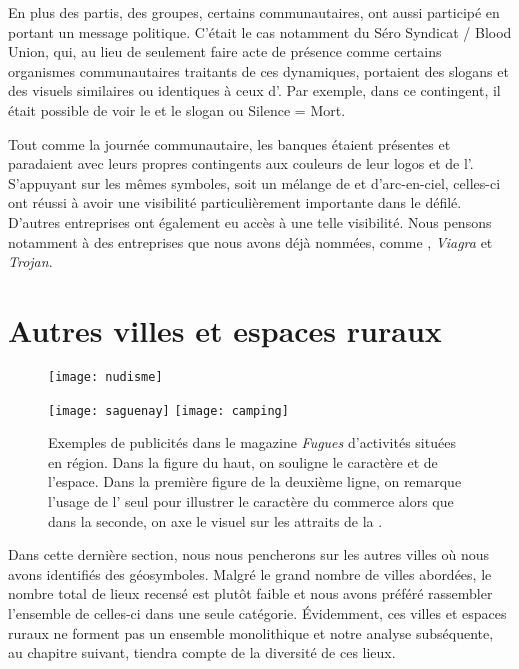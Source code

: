 En plus des partis, des groupes, certains communautaires, ont aussi participé en portant un message politique.
C'était le cas notamment du Séro Syndicat / Blood Union, qui, au lieu de seulement faire acte de présence comme certains organismes communautaires traitants de ces dynamiques, portaient des slogans et des visuels similaires ou identiques à ceux d’.
Par exemple, dans ce contingent, il était possible de voir le  et le slogan  ou Silence = Mort.

Tout comme la journée communautaire, les banques étaient présentes et paradaient avec leurs propres contingents aux couleurs de leur logos et de l'.
S'appuyant sur les mêmes symboles, soit un mélange de  et d'arc-en-ciel, celles-ci ont réussi à avoir une visibilité particulièrement importante dans le défilé.
D'autres entreprises ont également eu accès à une telle visibilité.
Nous pensons notamment à des entreprises que nous avons déjà nommées, comme , \emph{Viagra} et \emph{Trojan}.

\section{Autres villes et espaces ruraux}
\label{subsec:autresvilles}

\begin{figure}[ht!]
 \centering
 {\texttt{[image: nudisme]}}

 {\texttt{[image: saguenay]}}
 {\texttt{[image: camping]}}
 \caption[Événements en région]{Exemples de publicités dans le magazine \emph{Fugues} d'activités situées en région. Dans la figure du haut, on souligne le caractère  et  de l'espace. Dans la première figure de la deuxième ligne, on remarque l'usage de l' seul pour illustrer le caractère \lgbt{} du commerce alors que dans la seconde, on axe le visuel sur les attraits de la .}\label{figs:pubsregions}
\end{figure}

Dans cette dernière section, nous nous pencherons sur les autres villes où nous avons identifiés des géosymboles.
Malgré le grand nombre de villes abordées, le nombre total de lieux \lgbt{} recensé est plutôt faible et nous avons préféré rassembler l'ensemble de celles-ci dans une seule catégorie.
Évidemment, ces villes et espaces ruraux ne forment pas un ensemble monolithique et notre analyse subséquente, au chapitre suivant, tiendra compte de la diversité de ces lieux.

